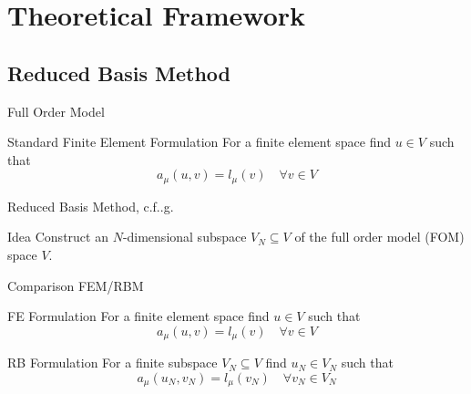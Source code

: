 \section{Theoretical Framework}

\subsection{Reduced Basis Method}

\begin{frame}{Full Order Model}
    \begin{block}{Standard Finite Element Formulation}
        For a finite element space find $u \in V$ such that
        \begin{equation*}
            a_\mu(u, v) = l_\mu(v) \quad \forall v \in V
        \end{equation*}
    \end{block}
\end{frame}

\begin{frame}{Reduced Basis Method, c.f.\@e.g.~\cite{Ohlberger2015}}
    \begin{block}{Idea}
        Construct an $N$-dimensional subspace $V_N \subseteq V$ of the full order model (FOM) space $V$.
    \end{block}

\end{frame}

\begin{frame}{Comparison FEM/RBM}
    \begin{block}{FE Formulation}
        For a finite element space find $u \in V$ such that
        \begin{equation*}
            a_\mu(u, v) = l_\mu(v) \quad \forall v \in V
        \end{equation*}
    \end{block}

    \begin{block}{RB Formulation}
        For a finite subspace $V_N \subseteq V$ find $u_N \in V_N$ such that
        \begin{equation*}
            a_\mu(u_N, v_N) = l_\mu(v_N) \quad \forall v_N \in V_N
        \end{equation*}
    \end{block}
\end{frame}

